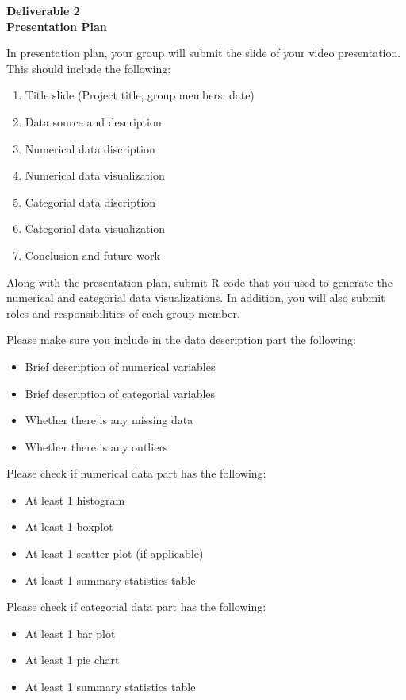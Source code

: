 \documentclass[12pt]{article}
\begin{document}
\begin{center}
\textbf{\Large Deliverable 2 \\ Presentation Plan} 
\end{center}


In presentation plan, your group will submit the slide of your video presentation.
This should include the following:
\begin{enumerate}
    \item Title slide (Project title, group members, date)
    \item Data source and description
    \item Numerical data discription
    \item Numerical data visualization
    \item Categorial data discription
    \item Categorial data visualization
    \item Conclusion and future work
\end{enumerate}


Along with the presentation plan, submit R code that you used to generate the numerical and categorial data visualizations. In addition,
you will also submit roles and responsibilities of each group member. 

Please make sure you include in the data description part the following:
\begin{itemize}    
    \item Brief description of numerical variables
    \item Brief description of categorial variables
    \item Whether there is any missing data
    \item Whether there is any outliers
\end{itemize}

Please check if numerical data part has the following:
\begin{itemize}
    \item At least 1 histogram
    \item At least 1 boxplot
    \item At least 1 scatter plot (if applicable)
    \item At least 1 summary statistics table
\end{itemize}

Please check if categorial data part has the following:
\begin{itemize}
    \item At least 1 bar plot
    \item At least 1 pie chart
    \item At least 1 summary statistics table
\end{itemize}
\end{document}
